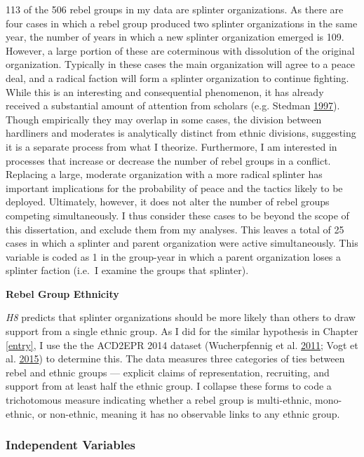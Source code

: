 \documentclass[12pt,]{book}
\theoremstyle{definition}
\theoremstyle{definition}
\theoremstyle{definition}
\theoremstyle{remark}
\begin{document}
113 of the 506 rebel groups in my data are splinter organizations. As
there are four cases in which a rebel group produced two splinter
organizations in the same year, the number of years in which a new
splinter organization emerged is 109. However, a large portion of these
are coterminous with dissolution of the original organization. Typically
in these cases the main organization will agree to a peace deal, and a
radical faction will form a splinter organization to continue fighting.
While this is an interesting and consequential phenomenon, it has
already received a substantial amount of attention from scholars (e.g.
Stedman \protect\hyperlink{ref-Stedman1997}{1997}). Though empirically
they may overlap in some cases, the division between hardliners and
moderates is analytically distinct from ethnic divisions, suggesting it
is a separate process from what I theorize. Furthermore, I am interested
in processes that increase or decrease the number of rebel groups in a
conflict. Replacing a large, moderate organization with a more radical
splinter has important implications for the probability of peace and the
tactics likely to be deployed. Ultimately, however, it does not alter
the number of rebel groups competing simultaneously. I thus consider
these cases to be beyond the scope of this dissertation, and exclude
them from my analyses. This leaves a total of 25 cases in which a
splinter and parent organization were active simultaneously. This
variable is coded as 1 in the group-year in which a parent organization
loses a splinter faction (i.e.~I examine the groups that splinter).

\textbf{Rebel Group Ethnicity}

\emph{H8} predicts that splinter organizations should be more likely
than others to draw support from a single ethnic group. As I did for the
similar hypothesis in Chapter \ref{entry}, I use the the ACD2EPR 2014
dataset (Wucherpfennig et al.
\protect\hyperlink{ref-Wucherpfennig2011}{2011}; Vogt et al.
\protect\hyperlink{ref-Vogt2015}{2015}) to determine this. The data
measures three categories of ties between rebel and ethnic groups ---
explicit claims of representation, recruiting, and support from at least
half the ethnic group. I collapse these forms to code a trichotomous
measure indicating whether a rebel group is multi-ethnic, mono-ethnic,
or non-ethnic, meaning it has no observable links to any ethnic group.

\hypertarget{independent-variables-2}{%
\subsubsection*{Independent Variables}\label{independent-variables-2}}
\end{document}
